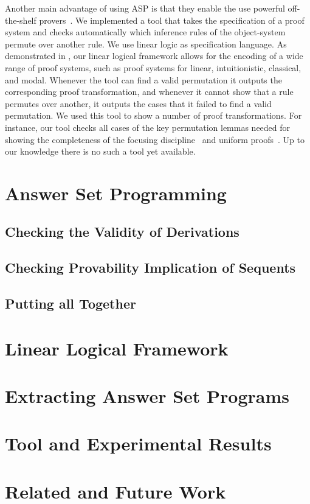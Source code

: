 \documentclass{new_tlp}
\begin{document}
Another main advantage of using ASP is that they enable the
use powerful off-the-shelf
provers~\cite{niemela97lpmnr,leone06tcl}. We
implemented a tool that takes the specification of a proof system and
checks automatically which inference rules of the object-system permute
over another rule. We use linear logic as specification language. As demonstrated
in \cite{nigam10jar,nigam11lsfa}, our linear logical framework allows for the encoding of 
a wide range of proof systems, such as proof systems for linear, intuitionistic, 
classical, and modal. Whenever the tool can find a valid permutation
it outputs the corresponding proof transformation,
and whenever it cannot show that a rule permutes over another, it outputs
the cases that it failed to find a valid permutation. 
We used this tool to show a number of proof
transformations. For instance, our tool checks all cases of the key
permutation lemmas
needed for showing the completeness of the focusing
discipline~\cite{andreoli92jlc} and uniform proofs~\cite{miller91apal}.
Up to our knowledge there is no such a tool yet available.


\section{Answer Set Programming}

\subsection{Checking the Validity of Derivations}

\subsection{Checking Provability Implication of Sequents}

\subsection{Putting all Together}

\section{Linear Logical Framework}

\section{Extracting Answer Set Programs}

\section{Tool and Experimental Results}

\section{Related and Future Work}




\end{document}
